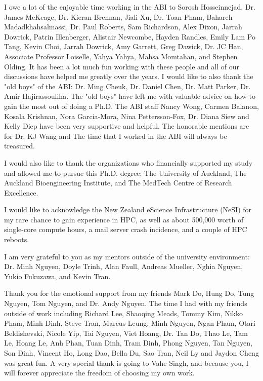 \begin{acknowledgements}
    
    I owe a lot of the enjoyable time working in the ABI to Sorosh Hosseinnejad, Dr. James McKeage, Dr. Kieran Brennan, Jiali Xu, Dr. Toan Pham, Bahareh Madadkhahsalmassi, Dr. Paul Roberts, Sam Richardson, Alex Dixon, Jarrah Dowrick, Patrin Illenberger, Alistair Newcombe, Hayden Randles, Emily Lam Po Tang, Kevin Choi, Jarrah Dowrick, Amy Garrett, Greg Dawick, Dr. JC Han, Associate Professor Loiselle, Yahya Yahya, Mahsa Momtahan, and Stephen Olding. It has been a lot much fun working with these people and all of our discussions have helped me greatly over the years. I would like to also thank the "old boys" of the ABI: Dr. Ming Cheuk, Dr. Daniel Chen, Dr. Matt Parker, Dr. Amir Hajirassouliha. The "old boys" have left me with valuable advice on how to gain the most out of doing a Ph.D. The ABI staff Nancy Wong, Carmen Balanon, Kosala Krishnan, Nora Garcia-Mora, Nina Pettersson-Fox, Dr. Diana Siew and Kelly Diep have been very supportive and helpful. The honorable mentions are for Dr. KJ Wang and The time that I worked in the ABI will always be treasured.
    
    
    I would also like to thank the organizations who financially supported my study and allowed me to pursue this Ph.D. degree: The University of Auckland, The Auckland Bioengineering Institute, and The MedTech Centre of Research Excellence. 
    
    
    I would like to acknowledge the New Zealand eScience Infrastructure (NeSI) for my rare chance to gain experience in HPC, as well as about 500,000 worth of single-core compute hours, a mail server crash incidence, and a couple of HPC reboots.
    
    
    I am very grateful to you as my mentors outside of the university environment: Dr. Minh Nguyen, Doyle Trinh, Alan Faull, Andreas Mueller, Nghia Nguyen, Yukio Fukuzawa, and Kevin Tran. 
    
    
    Thank you for the emotional support from my friends Mark Do, Hung Do, Tung Nguyen, Tom Nguyen, and Dr. Andy Nguyen. The time I had with my friends outside of work including Richard Lee, Shaoqing Meads, Tommy Kim, Nikko Pham, Minh Dinh, Steve Tran, Marcus Leung, Minh Nguyen, Ngan Pham, Otari Beldishevski, Nicole Yip, Tai Nguyen, Viet Hoang, Dr. Tan Do, Thao Le, Tam Le, Hoang Le, Anh Phan, Tuan Dinh, Tram Dinh, Phong Nguyen, Tan Nguyen, Son Dinh, Vincent Ho, Long Dao, Bella Du, Sao Tran, Neil Ly and Jaydon Cheng was great fun. A very special thank is going to Vahe Singh, and because you, I will forever appreciate the freedom of choosing my own work.
    

\end{acknowledgements}
